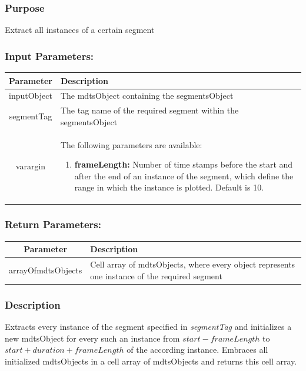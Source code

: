 \documentclass[a4]{scrreprt}
\begin{document}
\subsubsection{Purpose}

Extract all instances of a certain segment

\subsubsection{Input Parameters:}

\begin{longtabu} to \textwidth {|c|X|}
	\hline
	\textbf{Parameter} & \textbf{Description} \\ \hline
	\endhead
	inputObject & The mdtsObject containing the segmentsObject\\ \hline
	segmentTag & The tag name of the required segment within the segmentsObject\\ \hline
	varargin & The following parameters are available:
	\begin{enumerate}
		\item \textbf{frameLength:} Number of time stamps before the start and after the end of an instance of the segment, which define the range in which the instance is plotted. Default is 10.
	\end{enumerate} \\ \hline
\end{longtabu}

\subsubsection{Return Parameters:}

\begin{longtabu} to \textwidth {|c|X|}
	\hline
	\textbf{Parameter} & \textbf{Description} \\ \hline
	\endhead
	arrayOfmdtsObjects & Cell array of mdtsObjects, where every object represents one instance of the required segment\\ \hline
\end{longtabu}

\subsubsection{Description}

Extracts every instance of the segment specified in \textit{segmentTag} and initializes a new mdtsObject for every such an instance from $start - frameLength$ to $start + duration + frameLength$ of the according instance. Embraces all initialized mdtsObjects in a cell array of mdtsObjects and returns this cell array.
\end{document}
